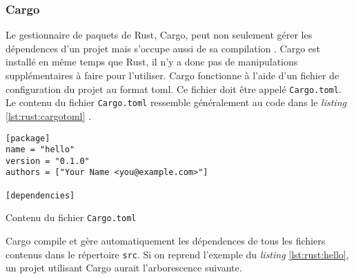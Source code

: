 
\subsubsection{Cargo}
Le gestionnaire de paquets de Rust, Cargo, peut non seulement gérer les dépendences
d'un projet mais s'occupe aussi de sa compilation \cite{ref3}. Cargo est installé
en même temps que Rust, il n'y a donc pas de manipulations supplémentaires à faire
pour l'utiliser. Cargo fonctionne à l'aide d'un fichier de configuration du projet
au format \acrshort{toml}. Ce fichier doit être appelé \texttt{Cargo.toml}.
Le contenu du fichier \texttt{Cargo.toml} ressemble généralement
au code dans le \textit{listing} \ref{lst:rust:cargotoml} \cite{ref2}.

\begin{code}
\begin{verbatim}
[package]
name = "hello"
version = "0.1.0"
authors = ["Your Name <you@example.com>"]

[dependencies]
\end{verbatim}
\caption{Contenu du fichier \texttt{Cargo.toml}}
\label{lst:rust:cargotoml}
\end{code} \bigbreak

Cargo compile et gère automatiquement les dépendences de tous les fichiers contenus
dans le répertoire \texttt{src}. Si on reprend l'exemple du \textit{listing}
\ref{lst:rust:hello}, un projet utilisant Cargo aurait l'arborescence suivante. \\

 \bigbreak

